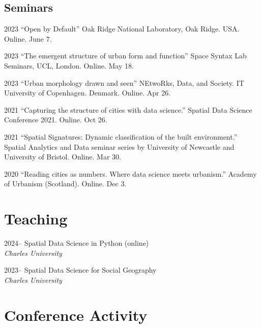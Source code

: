 \documentclass[12pt,a4paper]{report}
\begin{document}
    \subsection*{Seminars}

    \begin{tablist}

        \item[2023] \tab{}\enquote{Open by Default} Oak Ridge National Laboratory, Oak Ridge. USA. Online. June 7.
        \item[2023] \tab{}\enquote{The emergent structure of urban form and function} Space Syntax Lab Seminars, UCL, London. Online. May 18.
        \item[2023] \tab{}\enquote{Urban morphology drawn and seen} NEtwoRks, Data, and Society. IT University of Copenhagen. Denmark. Online. Apr 26.
        \item[2021] \tab{}\enquote{Capturing the structure of cities with data science.} Spatial Data Science Conference 2021. Online. Oct 26.
        \item[2021] \tab{}\enquote{Spatial Signatures: Dynamic classification of the built environment.} Spatial Analytics and Data seminar series by University of Newcastle and University of Bristol. Online. Mar 30.
        \item[2020] \tab{}\enquote{Reading cities as numbers. Where data science meets urbanism.} Academy of Urbanism (Scotland). Online. Dec 3.

    \end{tablist}

    \section*{Teaching}

    \begin{tablist}

        \item[2024--] \tab{}Spatial Data Science in Python (online) \\
                            \textit{Charles University}
        \item[2023--] \tab{}Spatial Data Science for Social Geography \\
                            \textit{Charles University}

    \end{tablist}


    \section*{Conference Activity}
\end{document}
